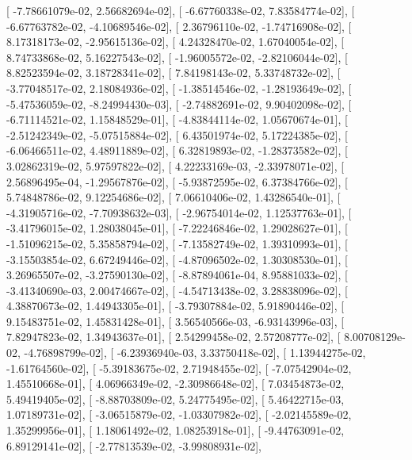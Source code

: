\documentclass{article}
\begin{document}
       [ -7.78661079e-02,   2.56682694e-02],
       [ -6.67760338e-02,   7.83584774e-02],
       [ -6.67763782e-02,  -4.10689546e-02],
       [  2.36796110e-02,  -1.74716908e-02],
       [  8.17318173e-02,  -2.95615136e-02],
       [  4.24328470e-02,   1.67040054e-02],
       [  8.74733868e-02,   5.16227543e-02],
       [ -1.96005572e-02,  -2.82106044e-02],
       [  8.82523594e-02,   3.18728341e-02],
       [  7.84198143e-02,   5.33748732e-02],
       [ -3.77048517e-02,   2.18084936e-02],
       [ -1.38514546e-02,  -1.28193649e-02],
       [ -5.47536059e-02,  -8.24994430e-03],
       [ -2.74882691e-02,   9.90402098e-02],
       [ -6.71114521e-02,   1.15848529e-01],
       [ -4.83844114e-02,   1.05670674e-01],
       [ -2.51242349e-02,  -5.07515884e-02],
       [  6.43501974e-02,   5.17224385e-02],
       [ -6.06466511e-02,   4.48911889e-02],
       [  6.32819893e-02,  -1.28373582e-02],
       [  3.02862319e-02,   5.97597822e-02],
       [  4.22233169e-03,  -2.33978071e-02],
       [  2.56896495e-04,  -1.29567876e-02],
       [ -5.93872595e-02,   6.37384766e-02],
       [  5.74848786e-02,   9.12254686e-02],
       [  7.06610406e-02,   1.43286540e-01],
       [ -4.31905716e-02,  -7.70938632e-03],
       [ -2.96754014e-02,   1.12537763e-01],
       [ -3.41796015e-02,   1.28038045e-01],
       [ -7.22246846e-02,   1.29028627e-01],
       [ -1.51096215e-02,   5.35858794e-02],
       [ -7.13582749e-02,   1.39310993e-01],
       [ -3.15503854e-02,   6.67249446e-02],
       [ -4.87096502e-02,   1.30308530e-01],
       [  3.26965507e-02,  -3.27590130e-02],
       [ -8.87894061e-04,   8.95881033e-02],
       [ -3.41340690e-03,   2.00474667e-02],
       [ -4.54713438e-02,   3.28838096e-02],
       [  4.38870673e-02,   1.44943305e-01],
       [ -3.79307884e-02,   5.91890446e-02],
       [  9.15483751e-02,   1.45831428e-01],
       [  3.56540566e-03,  -6.93143996e-03],
       [  7.82947823e-02,   1.34943637e-01],
       [  2.54299458e-02,   2.57208777e-02],
       [  8.00708129e-02,  -4.76898799e-02],
       [ -6.23936940e-03,   3.33750418e-02],
       [  1.13944275e-02,  -1.61764560e-02],
       [ -5.39183675e-02,   2.71948455e-02],
       [ -7.07542904e-02,   1.45510668e-01],
       [  4.06966349e-02,  -2.30986648e-02],
       [  7.03454873e-02,   5.49419405e-02],
       [ -8.88703809e-02,   5.24775495e-02],
       [  5.46422715e-03,   1.07189731e-02],
       [ -3.06515879e-02,  -1.03307982e-02],
       [ -2.02145589e-02,   1.35299956e-01],
       [  1.18061492e-02,   1.08253918e-01],
       [ -9.44763091e-02,   6.89129141e-02],
       [ -2.77813539e-02,  -3.99808931e-02],
\end{document}
